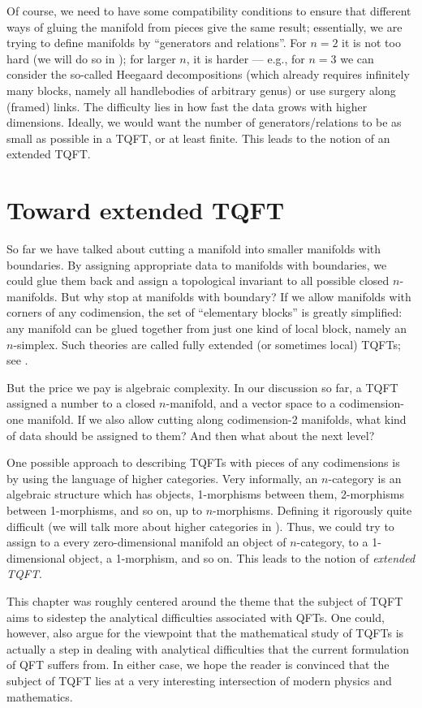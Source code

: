 Of course, we need to have some compatibility conditions to ensure that
different ways of gluing the manifold from pieces give the same result;
essentially, we are trying to define manifolds by ``generators and
relations''. For $n=2$ it is not too hard (we will do so in
); for larger $n$, it is harder --- e.g., for
$n=3$ we can consider the so-called Heegaard decompositions (which already
requires infinitely many blocks, namely all handlebodies of arbitrary
genus) or use surgery along (framed) links. The difficulty lies in how fast the data
grows with higher dimensions. Ideally, we would want the number of
generators/relations to be as small as possible in a TQFT, or at least
finite. This leads to the notion of an extended TQFT.

\section{Toward extended TQFT}\label{s:xtqft}
So far we have talked about cutting a manifold into smaller manifolds with
boundaries. By assigning appropriate data to manifolds with boundaries, we
could glue them back and assign a topological invariant to all possible closed
$n$-manifolds. But why stop at manifolds with boundary? If we allow manifolds
with corners of any codimension, the set of ``elementary blocks'' is greatly
simplified: any manifold can be glued together from just one kind of local
block, namely an $n$-simplex. Such theories are called fully extended (or
sometimes local) TQFTs; see .

But the price we pay is algebraic complexity. In our discussion so far, a TQFT
assigned a number to a closed $n$-manifold, and a vector space to a
codimension-one manifold. If we also allow cutting along codimension-2
manifolds, what kind of data should be assigned to them? And then what about the
next level?


One possible approach to describing  TQFTs with pieces of any codimensions
is by using the language of higher categories. Very informally, an
$n$-category is an algebraic structure which has objects, 1-morphisms
between them, 2-morphisms between 1-morphisms, and so on, up to
$n$-morphisms. Defining it rigorously quite difficult (we will talk more
about higher categories in ). Thus, we could try to
assign to a every zero-dimensional manifold an object of $n$-category, to a
1-dimensional object, a 1-morphism, and so on. This leads to the notion of
\emph{extended TQFT}.


This chapter was roughly centered around the theme that the subject of TQFT
aims to sidestep the analytical difficulties associated with QFTs. One could,
however, also argue for the viewpoint that the mathematical study of TQFTs is
actually a step in dealing with analytical difficulties that the current
formulation of QFT suffers from. In either case, we hope the reader is
convinced that the subject of TQFT lies at a very interesting intersection of
modern physics and mathematics.


